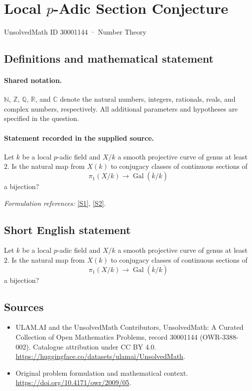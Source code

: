 \documentclass[11pt]{article}
\newcommand{\sref}[2]{\hyperlink{source:#1:#2}{[S#2]}}
\begin{document}
\setcounter{section}{30001143}
\section{\texorpdfstring{Local $p$-Adic Section Conjecture}{Local p-Adic Section Conjecture}}\label{30001144}
{\small UnsolvedMath ID 30001144 · Number Theory}
\subsection{Definitions and mathematical statement}

\paragraph{Shared notation.}$\mathbb N$, $\mathbb Z$, $\mathbb Q$, $\mathbb R$, and $\mathbb C$ denote the natural numbers, integers, rationals, reals, and complex numbers, respectively. All additional parameters and hypotheses are specified in the question.


\paragraph{Statement recorded in the supplied source.}
Let $k$ be a local $p$-adic field and $X/k$ a smooth projective curve of genus at least $2$. Is the natural map from $X(k)$ to conjugacy classes of continuous sections of $$\pi_1(X/k)\longrightarrow\operatorname{Gal}(\overline k/k)$$ a bijection?
\par\smallskip\textit{Formulation references:} \sref{30001144}{1}, \sref{30001144}{2}.
\subsection{Short English statement}
Let $k$ be a local $p$-adic field and $X/k$ a smooth projective curve of genus at least $2$. Is the natural map from $X(k)$ to conjugacy classes of continuous sections of $$\pi_1(X/k)\longrightarrow\operatorname{Gal}(\overline k/k)$$ a bijection?
\subsection{Sources}
\begin{itemize}
\item[\hypertarget{source:30001144:1}{S1}] ULAM.AI and the UnsolvedMath Contributors, UnsolvedMath: A Curated Collection of Open Mathematics Problems, record 30001144 (OWR-3388-002). Catalogue attribution under CC BY 4.0.
\url{https://huggingface.co/datasets/ulamai/UnsolvedMath}.
\item[\hypertarget{source:30001144:2}{S2}] Original problem formulation and mathematical context.
\url{https://doi.org/10.4171/owr/2009/05}.
\end{itemize}
\label{end:30001144}
\end{document}
